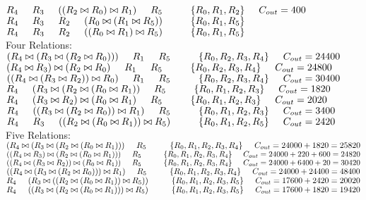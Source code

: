 \documentclass[11pt, a4]{article}
\newcommand\tab[1][0.5cm]{\hspace*{#1}}
\def\join{\bowtie}%
\begin{document}
\sout{$R_4 \tab R_3 \tab ((R_2 \join R_0) \join R_1) \tab R_5 \tab\tab \{R_0, R_1, R_2\} \tab C_{out} = 400$}\\
$R_4 \tab R_3 \tab R_2 \tab (R_0 \join (R_1 \join R_5)) \tab\tab \{R_0, R_1, R_5\} \tab$ \Lightning\\
$R_4 \tab R_3 \tab R_2 \tab ((R_0 \join R_1) \join R_5) \tab\tab \{R_0, R_1, R_5\} \tab$ \Lightning\\
Four Relations:\\
$(R_4 \join (R_3 \join (R_2 \join R_0))) \tab R_1 \tab R_5 \tab\tab \{R_0, R_2, R_3, R_4\} \tab C_{out} = 24400$\\
\sout{$(R_4 \join R_3) \join (R_2 \join R_0) \tab R_1 \tab R_5 \tab\tab \{R_0, R_2, R_3, R_4\} \tab C_{out} = 24800$}\\
\sout{$((R_4 \join (R_3 \join R_2)) \join R_0) \tab R_1 \tab R_5 \tab\tab \{R_0, R_2, R_3, R_4\} \tab C_{out} = 30400$}\\
$R_4 \tab (R_3 \join (R_2 \join (R_0 \join R_1)) \tab R_5 \tab\tab \{R_0, R_1, R_2, R_3\} \tab C_{out} = 1820$\\
\sout{$R_4 \tab (R_3 \join R_2) \join (R_0 \join R_1) \tab R_5 \tab\tab \{R_0, R_1, R_2, R_3\} \tab C_{out} = 2020$}\\
\sout{$R_4 \tab ((R_3 \join (R_2 \join R_0)) \join R_1) \tab R_5 \tab\tab \{R_0, R_1, R_2, R_3\} \tab C_{out} = 3400$}\\
$R_4 \tab R_3 \tab ((R_2 \join (R_0 \join R_1)) \join R_5) \tab\tab \{R_0, R_1, R_2, R_5\} \tab C_{out} = 2420$\\
Five Relations:\\
$(R_4 \join (R_3 \join (R_2 \join (R_0 \join R_1))) \tab R_5 \tab\tab \{R_0, R_1, R_2, R_3, R_4\} \tab C_{out} = 24000 + 1820 = 25820$\\
\sout{$((R_4 \join R_3) \join (R_2 \join (R_0 \join R_1))) \tab R_5 \tab\tab \{R_0, R_1, R_2, R_3, R_4\} \tab C_{out} = 24000 + 220 + 600 = 24820$}\\
\sout{$((R_4 \join (R_3 \join R_2)) \join (R_0 \join R_1)) \tab R_5 \tab\tab \{R_0, R_1, R_2, R_3, R_4\} \tab C_{out} = 24000 + 6400 + 20 = 30420$}\\
\sout{$((R_4 \join (R_3 \join (R_2 \join R_0))) \join R_1) \tab R_5 \tab\tab \{R_0, R_1, R_2, R_3, R_4\} \tab C_{out} = 24000 + 24400 = 48400$}\\
\sout{$R_4 \tab (R_3 \join ((R_2 \join (R_0 \join R_1)) \join R_5)) \tab\tab \{R_0, R_1, R_2, R_3, R_5\} \tab C_{out} = 17600 + 2420 = 20020$} \\
$R_4 \tab ((R_3 \join (R_2 \join (R_0 \join R_1))) \join R_5) \tab\tab \{R_0, R_1, R_2, R_3, R_5\} \tab C_{out} = 17600 + 1820 = 19420$ \\
\end{document}
